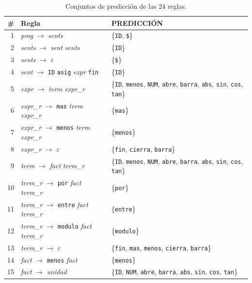 \documentclass[12pt,letterpaper]{article}
\begin{document}
\begin{table}[H]
\centering
\caption{Conjuntos de predicción de las 24 reglas.}
\footnotesize
\begin{tabular}{r l p{6.0cm}}
\toprule
\# & Regla & PREDICCIÓN \\
\midrule
1 & \textit{prog} $\rightarrow$ \textit{sents} & \{\texttt{ID}, \texttt{\$}\} \\
2 & \textit{sents} $\rightarrow$ \textit{sent} \textit{sents} & \{\texttt{ID}\} \\
3 & \textit{sents} $\rightarrow$ $\varepsilon$ & \{\texttt{\$}\} \\
4 & \textit{sent} $\rightarrow$ \texttt{ID} \texttt{asig} \textit{expr} \texttt{fin} & \{\texttt{ID}\} \\
5 & \textit{expr} $\rightarrow$ \textit{term} \textit{expr\_r} & \{\texttt{ID}, \texttt{menos}, \texttt{NUM}, \texttt{abre}, \texttt{barra}, \texttt{abs}, \texttt{sin}, \texttt{cos}, \texttt{tan}\} \\
6 & \textit{expr\_r} $\rightarrow$ \texttt{mas} \textit{term} \textit{expr\_r} & \{\texttt{mas}\} \\
7 & \textit{expr\_r} $\rightarrow$ \texttt{menos} \textit{term} \textit{expr\_r} & \{\texttt{menos}\} \\
8 & \textit{expr\_r} $\rightarrow$ $\varepsilon$ & \{\texttt{fin}, \texttt{cierra}, \texttt{barra}\} \\
9 & \textit{term} $\rightarrow$ \textit{fact} \textit{term\_r} & \{\texttt{ID}, \texttt{menos}, \texttt{NUM}, \texttt{abre}, \texttt{barra}, \texttt{abs}, \texttt{sin}, \texttt{cos}, \texttt{tan}\} \\
10 & \textit{term\_r} $\rightarrow$ \texttt{por} \textit{fact} \textit{term\_r} & \{\texttt{por}\} \\
11 & \textit{term\_r} $\rightarrow$ \texttt{entre} \textit{fact} \textit{term\_r} & \{\texttt{entre}\} \\
12 & \textit{term\_r} $\rightarrow$ \texttt{modulo} \textit{fact} \textit{term\_r} & \{\texttt{modulo}\} \\
13 & \textit{term\_r} $\rightarrow$ $\varepsilon$ & \{\texttt{fin}, \texttt{mas}, \texttt{menos}, \texttt{cierra}, \texttt{barra}\} \\
14 & \textit{fact} $\rightarrow$ \texttt{menos} \textit{fact} & \{\texttt{menos}\} \\
15 & \textit{fact} $\rightarrow$ \textit{unidad} & \{\texttt{ID}, \texttt{NUM}, \texttt{abre}, \texttt{barra}, \texttt{abs}, \texttt{sin}, \texttt{cos}, \texttt{tan}\} \\

\end{tabular}
\end{table}
\end{document}
